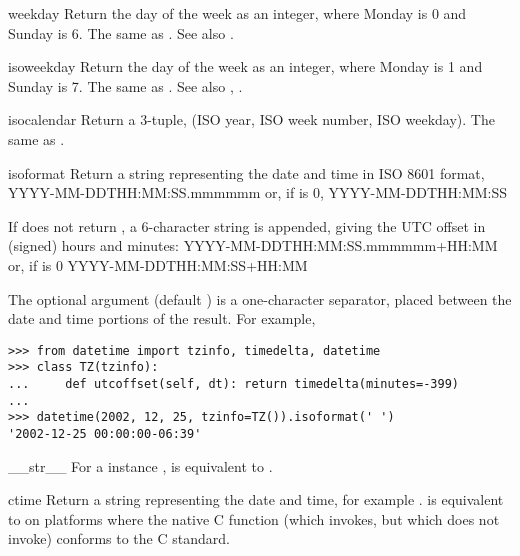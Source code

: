 \begin{methoddesc}{weekday}{}
  Return the day of the week as an integer, where Monday is 0 and
  Sunday is 6.  The same as .
  See also .
\end{methoddesc}

\begin{methoddesc}{isoweekday}{}
  Return the day of the week as an integer, where Monday is 1 and
  Sunday is 7.  The same as .
  See also , .
\end{methoddesc}

\begin{methoddesc}{isocalendar}{}
  Return a 3-tuple, (ISO year, ISO week number, ISO weekday).  The
  same as .
\end{methoddesc}

\begin{methoddesc}{isoformat}{}
  Return a string representing the date and time in ISO 8601 format,
      YYYY-MM-DDTHH:MM:SS.mmmmmm
  or, if  is 0,
      YYYY-MM-DDTHH:MM:SS

  If  does not return , a 6-character
  string is appended, giving the UTC offset in (signed) hours and
  minutes:
      YYYY-MM-DDTHH:MM:SS.mmmmmm+HH:MM
  or, if  is 0
      YYYY-MM-DDTHH:MM:SS+HH:MM

  The optional argument  (default ) is a
  one-character separator, placed between the date and time portions
  of the result.  For example,

\begin{verbatim}
>>> from datetime import tzinfo, timedelta, datetime
>>> class TZ(tzinfo):
...     def utcoffset(self, dt): return timedelta(minutes=-399)
...
>>> datetime(2002, 12, 25, tzinfo=TZ()).isoformat(' ')
'2002-12-25 00:00:00-06:39'
\end{verbatim}
\end{methoddesc}

\begin{methoddesc}{__str__}{}
  For a  instance ,  is
  equivalent to .
\end{methoddesc}

\begin{methoddesc}{ctime}{}
  Return a string representing the date and time, for example
  .
   is equivalent to
   on platforms where
  the native C  function (which
   invokes, but which
   does not invoke) conforms to the C
  standard.
\end{methoddesc}

